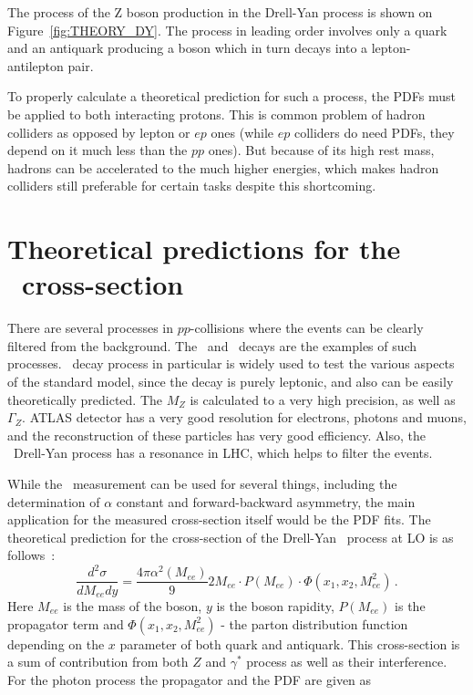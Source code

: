 The process of the Z boson production in the Drell-Yan process is shown on Figure~\ref{fig:THEORY_DY}. The process in leading order involves only a quark and an antiquark producing a boson which in turn decays into a lepton-antilepton pair.

To properly calculate a theoretical prediction for such a process, the PDFs must be applied to both interacting protons. This is common problem of hadron colliders as opposed by lepton or $ep$ ones (while $ep$ colliders do need PDFs, they depend on it much less than the $pp$ ones). But because of its high rest mass, hadrons can be accelerated to the much higher energies, which makes hadron colliders still preferable for certain tasks despite this shortcoming.

\section{Theoretical predictions for the \Zee\ cross-section}

There are several processes in $pp$-collisions where the events can be clearly filtered from the background. The \Wenu\ and \Zee\ decays are the examples of such processes. \Zll\ decay process in particular is widely used to test the various aspects of the standard model, since the decay is purely leptonic, and also can be easily theoretically predicted. The $M_Z$ is calculated to a very high precision, as well as $\Gamma_Z$. ATLAS detector has a very good resolution for electrons, photons and muons, and the reconstruction of these particles has very good efficiency. Also, the \Zee\ Drell-Yan process has a resonance in LHC, which helps to filter the events.

While the \Zll\ measurement can be used for several things, including the determination of $\alpha$ constant and forward-backward asymmetry, the main application for the measured cross-section itself would be the PDF fits. The theoretical prediction for the cross-section of the Drell-Yan \Zgee\ process at LO is as follows~\cite{lib:theory_Z-c-s}:
\begin{equation}
\label{eq:theory_c-s}
\frac{d^{2}\sigma}{dM_{ee}dy} = \frac{4\pi\alpha^{2}(M_{ee})}{9}2M_{ee}\cdot P(M_{ee})\cdot\Phi(x_{1},x_{2},M^{2}_{ee})\,.
\end{equation}
Here $M_{ee}$ is the mass of the boson, $y$ is the boson rapidity, $P(M_{ee})$ is the propagator term and $\Phi(x_{1},x_{2},M^{2}_{ee})$ - the parton distribution function depending on the $x$ parameter of both quark and antiquark. This cross-section is a sum of contribution from both $Z$ and $\gamma^*$ process as well as their interference. For the photon process the propagator and the PDF are given as


